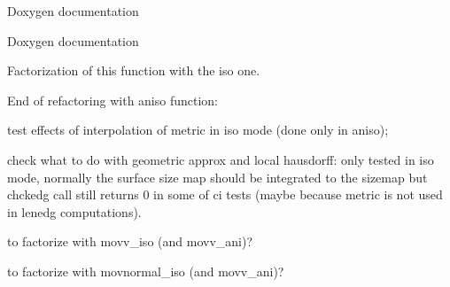 \begin{DoxyRefList}
\label{todo__todo000024}%
%
Doxygen documentation  
\item[File \mbox{\hyperlink{mmg3d3_8c}{mmg3d3.c}} ]\label{todo__todo000026}%
%
Doxygen documentation  
\item[Global \mbox{\hyperlink{anisomovpt__3d_8c_a53bc471b0426ce45eaf7d96c8cc9c15d}{MMG3\+D\+\_\+movbdycurvept\+\_\+ani}} (MMG5\+\_\+p\+Mesh mesh, MMG5\+\_\+p\+Sol met, MMG3\+D\+\_\+p\+PROctree PROctree, int64\+\_\+t $\ast$listv, int ilistv, MMG5\+\_\+int $\ast$lists, int ilists, int improve, const int16\+\_\+t edg\+Tag)]\label{todo__todo000013}%
%
Factorization of this function with the iso one.  
\item[Global \mbox{\hyperlink{movpt__3d_8c_a8bd9de0189d8e0652c3c7e47daa8d50c}{MMG3\+D\+\_\+movbdycurvept\+\_\+iso}} (MMG5\+\_\+p\+Mesh mesh, MMG5\+\_\+p\+Sol met, MMG3\+D\+\_\+p\+PROctree PROctree, int64\+\_\+t $\ast$listv, int ilistv, MMG5\+\_\+int $\ast$lists, int ilists, int improve, const int16\+\_\+t edg\+Tag)]\label{todo__todo000028}%
%
End of refactoring with aniso function\+:
\begin{DoxyItemize}
\item test effects of interpolation of metric in iso mode (done only in aniso);
\item check what to do with geometric approx and local hausdorff\+: only tested in iso mode, normally the surface size map should be integrated to the sizemap but chckedg call still returns 0 in some of ci tests (maybe because metric is not used in lenedg computations).  
\end{DoxyItemize}
\item[Global \mbox{\hyperlink{movpt__3d_8c_a1bb3470119319330106e3bd6f7275f1e}{MMG3\+D\+\_\+movnormal\+\_\+iso}} (MMG5\+\_\+p\+Mesh mesh, MMG5\+\_\+p\+Sol sol, MMG5\+\_\+int k, int ib)]\label{todo__todo000029}%
%
to factorize with movv\+\_\+iso (and movv\+\_\+ani)?  
\item[Global \mbox{\hyperlink{movpt__3d_8c_aadb5d7c16c2ca86cc5cc950a76ab24c6}{MMG3\+D\+\_\+movv\+\_\+iso}} (MMG5\+\_\+p\+Mesh mesh, MMG5\+\_\+p\+Sol sol, MMG5\+\_\+int k, int ib)]\label{todo__todo000030}%
%
to factorize with movnormal\+\_\+iso (and movv\+\_\+ani)?  
\item[Global \mbox{\hyperlink{quality__3d_8c_a9ca1aba7ffb80ae15c740d63be629f7c}{MMG5\+\_\+caltet33\+\_\+ani}} (MMG5\+\_\+p\+Mesh mesh, MMG5\+\_\+p\+Sol met, MMG5\+\_\+p\+Tetra pt)]\label{todo__todo000031}%

\end{DoxyRefList}
